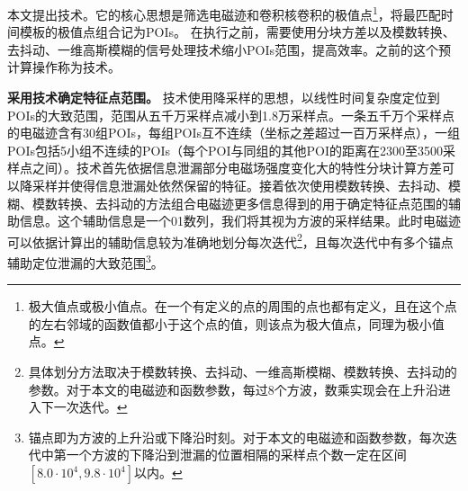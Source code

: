 {{	本文提出\yuchuli 技术。它的核心思想是筛选电磁迹和卷积核卷积的极值点\footnote{极大值点或极小值点。在一个有定义的点的周围的点也都有定义，且在这个点的左右邻域的函数值都小于这个点的值，则该点为极大值点，同理为极小值点。}，将最匹配时间模板的极值点组合记为POIs。
%	
	在执行\yuchuli 之前，需要使用分块方差以及模数转换、去抖动、一维高斯模糊的信号处理技术缩小POIs范围，提高\yuchuli 效率。\yuchuli 之前的这个预计算操作称为\poifanwei 技术。
	
	

	\textbf{采用\poifanwei 技术确定特征点范围。}	
	\poifanwei 技术使用降采样的思想，以线性时间复杂度定位到POIs的大致范围，范围从五千万采样点减小到1.8万采样点。一条五千万个采样点的电磁迹含有30组POIs，每组POIs互不连续（坐标之差超过一百万采样点），一组POIs包括5小组不连续的POIs（每个POI与同组的其他POI的距离在2300至3500采样点之间）。\poifanwei 技术首先依据信息泄漏部分电磁场强度变化大的特性分块计算方差可以降采样并使得信息泄漏处依然保留的特征。接着依次使用模数转换、去抖动、模糊、模数转换、去抖动的方法组合电磁迹更多信息得到的用于确定特征点范围的辅助信息。这个辅助信息是一个01数列，我们将其视为方波的采样结果。此时电磁迹可以依据计算出的辅助信息较为准确地划分每次迭代\footnote{具体划分方法取决于模数转换、去抖动、一维高斯模糊、模数转换、去抖动的参数。对于本文的电磁迹和函数参数，每过8个方波，数乘实现会在上升沿进入下一次迭代。}，且每次迭代中有多个锚点辅助定位泄漏的大致范围\footnote{锚点即为方波的上升沿或下降沿时刻。对于本文的电磁迹和函数参数，每次迭代中第一个方波的下降沿到泄漏的位置相隔的采样点个数一定在区间$[8.0\cdot10^{4},9.8\cdot10^{4}]$以内。}。
	
}}
